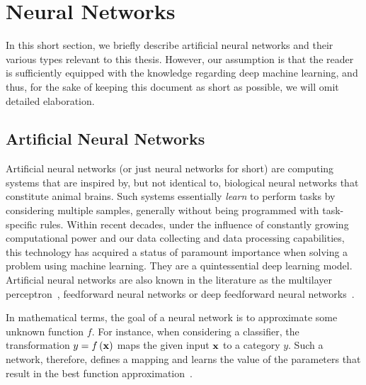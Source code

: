 \section{Neural Networks}

In this short section, we briefly describe artificial neural networks and their various types relevant to this thesis. However, our assumption is that the reader is sufficiently equipped with the knowledge regarding deep machine learning, and thus, for the sake of keeping this document as short as possible, we will omit detailed elaboration.

\subsection{Artificial Neural Networks}
\label{ssec:ArtificialNeuralNetworks}

Artificial neural networks (or just neural networks for short) are computing systems that are inspired by, but not identical to, biological neural networks that constitute animal brains. Such systems essentially \emph{learn} to perform tasks by considering multiple samples, generally without being programmed with task-specific rules. Within recent decades, under the influence of constantly growing computational power and our data collecting and data processing capabilities, this technology has acquired a status of paramount importance when solving a problem using machine learning. They are a quintessential deep learning model. Artificial neural networks are also known in the literature as the multilayer perceptron~\cite{rosenblatt1958perceptron}, feedforward neural networks or deep feedforward neural networks~\cite{goodfellow2016dl}.

In mathematical terms, the goal of a neural network is to approximate some unknown function $f$. For instance, when considering a classiﬁer, the transformation $y = {f} \left( {\mathbf{x}} \right)$  maps the given input ${\mathbf{x}}$ to a category $y$. Such a network, therefore, defines a mapping and learns the value of the parameters that result in the best function approximation~\cite{goodfellow2016dl}.


